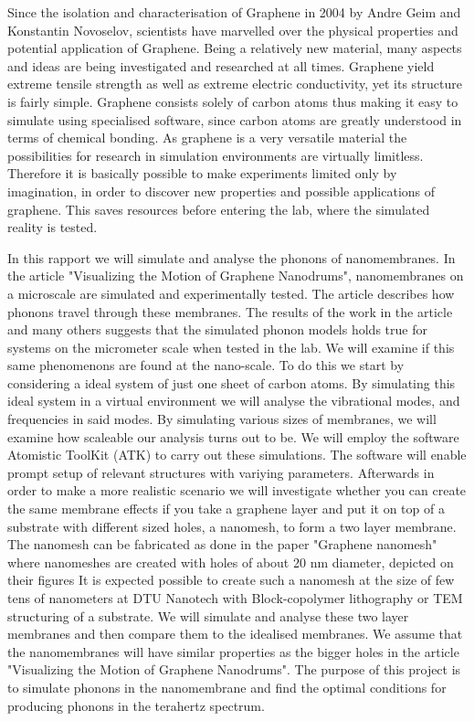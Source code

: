 
Since the isolation and characterisation of
Graphene in 2004 by Andre Geim and
Konstantin Novoselov, scientists have marvelled over the physical properties and potential
application of Graphene. Being a relatively new material, many aspects and ideas are being
investigated and researched at all times. Graphene yield extreme tensile strength as well as
extreme electric conductivity, yet its structure is fairly simple. Graphene consists solely of
carbon atoms thus making it easy to simulate using specialised software, since carbon atoms are greatly understood in terms of chemical
bonding.
As graphene is a very versatile material the possibilities for research in simulation environments are virtually limitless.
Therefore it is basically possible to make experiments limited only by imagination, in order
to discover new properties and possible applications of graphene. This saves resources
before entering the lab, where the simulated reality is tested.

In this rapport we will simulate and analyse the phonons of nanomembranes. In the article "Visualizing the Motion of Graphene Nanodrums"\cite{Davidovikj2016}, nanomembranes on a microscale are simulated and experimentally tested. The article describes how phonons travel through these membranes. The results of the work in the article\cite[Figure 3]{Davidovikj2016} and many others suggests that the simulated phonon models holds true for systems on the micrometer scale when tested in the lab. We will examine if this same phenomenons are found at the nano-scale. To do this we start by considering a ideal system of just one sheet of carbon atoms. By simulating this ideal system in a virtual environment we will analyse the vibrational modes, and frequencies in said modes. By simulating various sizes of membranes, we will examine how scaleable our analysis turns out to be.
We will employ the software Atomistic ToolKit (ATK)\cite{QuantumWise} to carry out these simulations. The
software will enable prompt setup of relevant structures with variying parameters.
Afterwards in order to make a more realistic scenario we will investigate whether you can create the same membrane effects if you take a graphene layer and put it on top of a substrate with different sized holes, a nanomesh, to form a two layer membrane.
The nanomesh can be fabricated as done in the paper "Graphene nanomesh"\cite{Bai2010} where nanomeshes are created with holes of about 20 nm diameter, depicted on their figures\cite[Fig 2]{Bai2010}
It is expected possible to create such a nanomesh at the
size of few tens of nanometers at DTU Nanotech with Block-copolymer lithography or TEM
structuring of a substrate.
We will simulate and analyse these two layer membranes and then compare them to the idealised membranes.
We assume that the nanomembranes will have similar properties as the bigger holes in the article "Visualizing the Motion of Graphene Nanodrums"\cite[Fig 3]{Davidovikj2016}.
The purpose of this project is to
simulate phonons in the nanomembrane and find the optimal conditions for producing
phonons in the terahertz spectrum.

